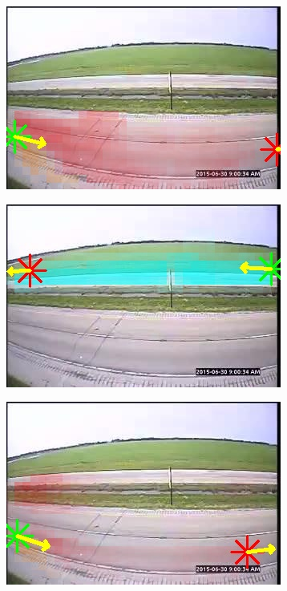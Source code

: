 \begin{figure}
    \centering
        \begin{subfigure}{0.32\linewidth}
            \includegraphics[width=\linewidth]{./img/scene_learning/res/245837/245837-0.jpg}
        \end{subfigure}
        \begin{subfigure}{0.32\linewidth}
            \includegraphics[width=\linewidth]{./img/scene_learning/res/245837/245837-1.jpg}
        \end{subfigure}
        \begin{subfigure}{0.32\linewidth}
            \includegraphics[width=\linewidth]{./img/scene_learning/res/245837/245837-2.jpg}

\end{subfigure}
\end{figure}
